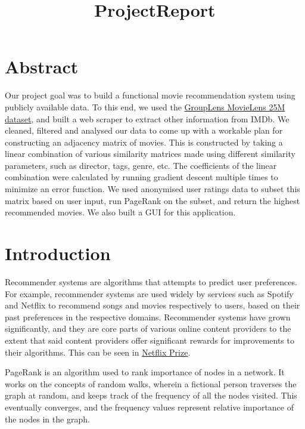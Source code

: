 \documentclass[11pt]{article}
\title{ProjectReport}
\begin{document}
    
    \maketitle
    
    

    
    \hypertarget{abstract}{%
\section{Abstract}\label{abstract}}

Our project goal was to build a functional movie recommendation system
using publicly available data. To this end, we used the
\href{https://grouplens.org/datasets/movielens/}{GroupLens MovieLens 25M
dataset}, and built a web scraper to extract other information from
IMDb. We cleaned, filtered and analysed our data to come up with a
workable plan for constructing an adjacency matrix of movies. This is
constructed by taking a linear combination of various similarity
matrices made using different similarity parameters, such as director,
tags, genre, etc. The coefficients of the linear combination were
calculated by running gradient descent multiple times to minimize an
error function. We used anonymised user ratings data to subset this
matrix based on user input, run PageRank on the subset, and return the
highest recommended movies. We also built a GUI for this application.

    \hypertarget{introduction}{%
\section{Introduction}\label{introduction}}

Recommender systems are algorithms that attempts to predict user
preferences. For example, recommender systems are used widely by
services such as Spotify and Netflix to recommend songs and movies
respectively to users, based on their past preferences in the respective
domains. Recommender systems have grown significantly, and they are core
parts of various online content providers to the extent that said
content providers offer significant rewards for improvements to their
algorithms. This can be seen in
\href{https://www.kaggle.com/netflix-inc/netflix-prize-data}{Netflix
Prize}.

PageRank is an algorithm used to rank importance of nodes in a network.
It works on the concepts of random walks, wherein a fictional person
traverses the graph at random, and keeps track of the frequency of all
the nodes visited. This eventually converges, and the frequency values
represent relative importance of the nodes in the graph.
\end{document}
